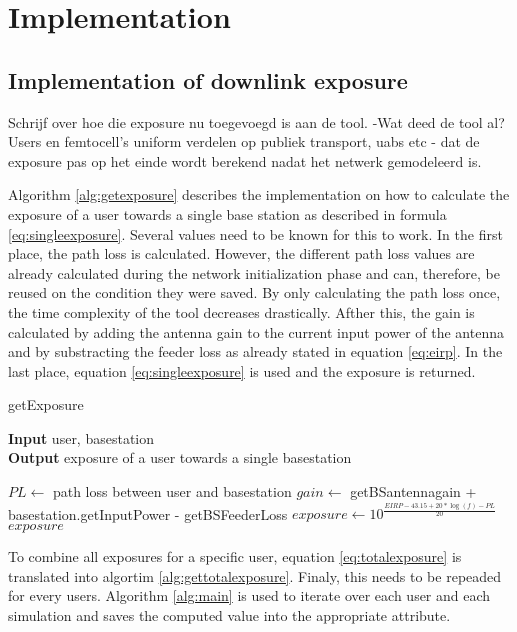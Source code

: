 \chapter{Implementation}
\label{chap:implementation}

\section{Implementation of downlink exposure}
\label{sec:downlinkimplementation}

Schrijf over hoe die exposure nu toegevoegd is aan de tool. 
-Wat deed de tool al? Users en femtocell's uniform verdelen op publiek transport, uabs etc
- dat de exposure pas op het einde wordt berekend nadat het netwerk gemodeleerd is.

Algorithm \ref{alg:getexposure} describes the implementation on how to calculate the exposure of a user towards a single base station as described in formula \ref{eq:singleexposure}.
Several values need to be known for this to work. In the first place, the path loss is calculated.  However, the different path loss values are already calculated during the network initialization phase and can, therefore, be reused on the condition they were saved. By only calculating the path loss once,  the time complexity of the tool decreases drastically. 
Afther this, the gain is calculated by adding the antenna gain to the  current input power of the antenna and by substracting the feeder loss as already stated in equation \ref{eq:eirp}.
In the last place, equation \ref{eq:singleexposure} is used and the exposure is returned.

\begin{algorithm}
	\caption{getExposure} 
	\label{alg:getexposure}
     \hspace*{\algorithmicindent} \textbf{Input} user, basestation\\
     \hspace*{\algorithmicindent} \textbf{Output} exposure of a user towards a single basestation
	\begin{algorithmic}[1]
        \State $PL \gets$ path loss between user and basestation
        \State $gain \gets$ getBSantennagain + basestation.getInputPower - getBSFeederLoss
		\State $exposure \gets 10^{\frac{EIRP - 43.15 + 20*\log(f)- PL}{20}}$ \\
    \Return $exposure$ 
	\end{algorithmic} 
\end{algorithm}

To combine all exposures for a specific user, equation \ref{eq:totalexposure} is translated into algortim \ref{alg:gettotalexposure}.
Finaly, this needs to be repeaded for every users. Algorithm \ref{alg:main} is used to iterate over each user and each simulation and saves the computed value
into the appropriate attribute.

